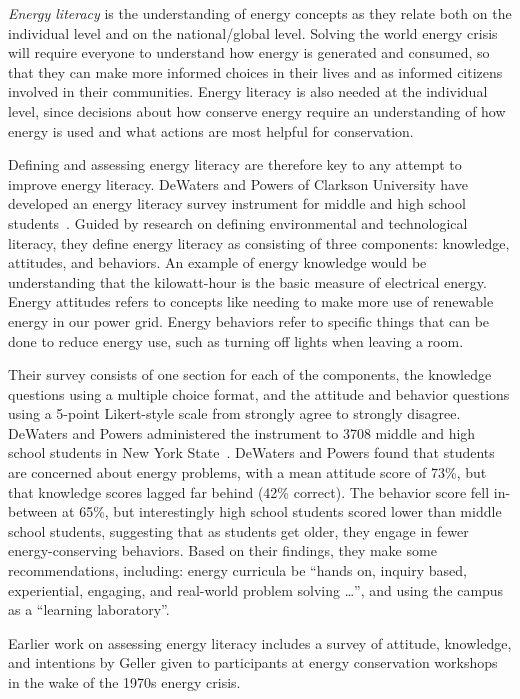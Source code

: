\emph{Energy literacy} is the understanding of energy concepts as they relate both on the individual level and on the national/global level. Solving the world energy crisis will require everyone to understand how energy is generated and consumed, so that they can make more informed choices in their lives and as informed citizens involved in their communities. Energy literacy is also needed at the individual level, since decisions about how conserve energy require an understanding of how energy is used and what actions are most helpful for conservation.

Defining and assessing energy literacy are therefore key to any attempt to improve energy literacy. DeWaters and Powers of Clarkson University have developed an energy literacy survey instrument for middle and high school students~\cite{DeWaters2007,DeWaters2008}. Guided by research on defining environmental and technological literacy, they define energy literacy as consisting of three components: knowledge, attitudes, and behaviors. An example of energy knowledge would be understanding that the kilowatt-hour is the basic measure of electrical energy. Energy attitudes refers to concepts like needing to make more use of renewable energy in our power grid. Energy behaviors refer to specific things that can be done to reduce energy use, such as turning off lights when leaving a room.

Their survey consists of one section for each of the components, the knowledge questions using a multiple choice format, and the attitude and behavior questions using a 5-point Likert-style scale from strongly agree to strongly disagree. DeWaters and Powers administered the instrument to 3708 middle and high school students in New York State~\cite{DeWaters2011}. DeWaters and Powers found that students are concerned about energy problems, with a mean attitude score of 73\%, but that knowledge scores lagged far behind (42\% correct). The behavior score fell in-between at 65\%, but interestingly high school students scored lower than middle school students, suggesting that as students get older, they engage in fewer energy-conserving behaviors. Based on their findings, they make some recommendations, including: energy curricula be ``hands on, inquiry based, experiential, engaging, and real-world problem solving \ldots'', and using the campus as a ``learning laboratory''.

Earlier work on assessing energy literacy includes a survey of attitude, knowledge, and intentions by Geller \cite{Geller81} given to participants at energy conservation workshops in the wake of the 1970s energy crisis. 


